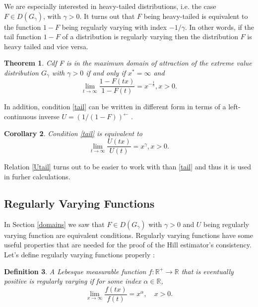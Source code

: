 \documentclass[english,12pt,a4paper,pdftex,sci,utf8]{aaltothesis} %
\newtheorem{theorem}{Theorem}[section]
\newtheorem{corollary}[theorem]{Corollary}
\newtheorem{definition}[theorem]{Definition}
\begin{document}
We are especially interested in heavy-tailed distributions, i.e. the case $F \in D(G_{\gamma})$, with $\gamma>0$. It turns out that $F$ being heavy-tailed is equivalent to the function $1-F$ being regularly varying with index $-1/ \gamma$. In other words, if the tail function $1-F$ of a distribution is regularly varying then the distribution $F$ is heavy tailed and vice versa. \cite{deHaan}

\begin{theorem}
Cdf F is in the maximum domain of attraction of the extreme value distribution $G_{\gamma}$ with $\gamma>0$ if and only if $x^*=\infty$ and
\begin{equation}
\lim_{t\rightarrow \infty} \frac{1-F(tx)}{1-F(t)} = x^{-\frac{1}{\gamma}}, x>0.
\label{tail}
\end{equation}
\end{theorem}

In addition, condition \eqref{tail} can be written in different form in terms of a left-continuous inverse $U=(1/(1-F))^{\leftarrow}$ \cite{deHaan}.

\begin{corollary}
Condition \eqref{tail} is equivalent to
\begin{equation}
\lim_{t \rightarrow \infty} \frac{U(tx)}{U(t)} = x^{\gamma}, x>0.
\label{Utail}
\end{equation}
\end{corollary}

Relation \eqref{Utail} turns out to be easier to work with than \eqref{tail} and thus it is used in furher calculations.


\subsection{Regularly Varying Functions}

In Section \ref{domains} we saw that $F \in D(G_{\gamma})$ with $\gamma>0$ and $U$ being regularly varying function are equivalent conditions. Regularly varying functions have some useful properties that are needed for the proof of the Hill estimator's consistency. Let's define regularly varying functions properly \cite{deHaan}:
\begin{definition}
A Lebesque measurable function $f: \mathbb{R}^{+} \rightarrow \mathbb{R}$ that is eventually positive is regularly varying if for some index $\alpha \in \mathbb{R}$,
\begin{equation}
\lim_{x \rightarrow \infty} \frac{f(tx)}{f(t)} = x^{\alpha}, \quad x>0.
\label{regular}
\end{equation}
\label{regularDef}
\end{definition}
\end{document}
